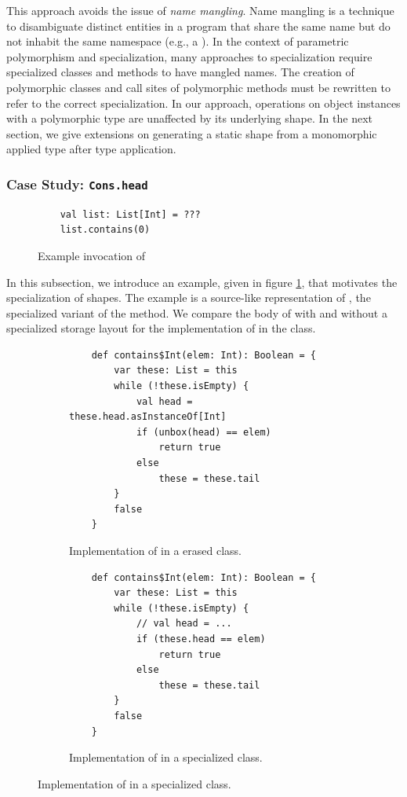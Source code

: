This approach avoids the issue of \textit{name mangling}.
Name mangling is a technique to disambiguate distinct entities in a program that share the same name but do not inhabit the same namespace (e.g., a ).
In the context of parametric polymorphism and specialization, many approaches to specialization require specialized classes and methods to have mangled names.
The creation of polymorphic classes and call sites of polymorphic methods must be rewritten to refer to the correct specialization.
In our approach, operations on object instances with a polymorphic type are unaffected by its underlying shape.
In the next section, we give extensions on generating a static shape from a monomorphic applied type after type application.

\subsubsection*{Case Study: \texttt{Cons.head}}

\begin{figure}[!htb]
	\begin{verbatim}
	val list: List[Int] = ???
	list.contains(0)
	\end{verbatim}
	\caption{Example invocation of }
	\label{example:list-contains-example}
\end{figure}

In this subsection, we introduce an example, given in figure \ref{example:list-contains-example}, that motivates the specialization of shapes.
The example is a source-like representation of , the specialized variant of the  method.
We compare the body of  with and without a specialized storage layout for the implementation of  in the  class.

\begin{figure}[!htb]
	\centering
	\begin{subfigure}[b]{0.48\textwidth}
	\begin{verbatim}
	def contains$Int(elem: Int): Boolean = {
		var these: List = this
		while (!these.isEmpty) {
			val head = these.head.asInstanceOf[Int]
			if (unbox(head) == elem)
				return true
			else 
				these = these.tail
		}
		false
	}	
	\end{verbatim}
	\caption{Implementation of  in a erased  class.}
	\label{impl:cons-contains-erased}
	\end{subfigure}
	\hfill
	\begin{subfigure}[b]{0.48\textwidth}
	\begin{verbatim}
	def contains$Int(elem: Int): Boolean = {
		var these: List = this
		while (!these.isEmpty) {
			// val head = ...
			if (these.head == elem) 
				return true
			else 
				these = these.tail
		}
		false
	}	
	\end{verbatim}
	\caption{Implementation of  in a specialized  class.}
	\label{impl:cons-contains-specialized}
	\end{subfigure}
\end{figure}

